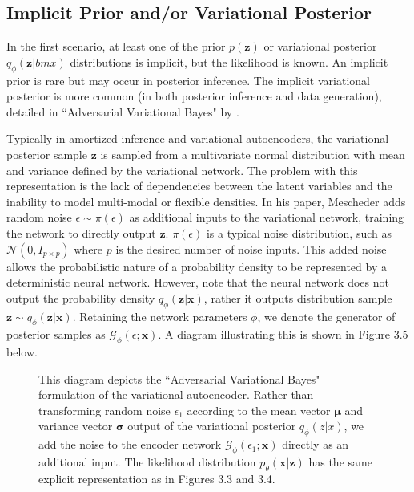 \documentclass[honours,12pt]{unswthesis}
\numberwithin{equation}{section}
\theoremstyle{definition}
\begin{document}
\subsection{Implicit Prior and/or Variational Posterior}
In the first scenario, at least one of the prior $p(\bm{z})$ or variational posterior $q_\phi(\bm{z}|bm{x})$ distributions is implicit, but the likelihood is known. An implicit prior is rare but may occur in posterior inference. The implicit variational posterior is more common (in both posterior inference and data generation), detailed in ``Adversarial Variational Bayes" by \citet{mescheder}.

Typically in amortized inference and variational autoencoders, the variational posterior sample $\bm{z}$ is sampled from a multivariate normal distribution with mean and variance defined by the variational network. The problem with this representation is the lack of dependencies between the latent variables and the inability to model multi-modal or flexible densities. In his paper, Mescheder adds random noise $\epsilon\sim \pi(\epsilon)$ as additional inputs to the variational network, training the network to directly output $\bm{z}$. $\pi(\epsilon)$ is a typical noise distribution, such as $\mathcal{N}(0,I_{p\times p})$ where $p$ is the desired number of noise inputs. This added noise allows the probabilistic nature of a probability density to be represented by a deterministic neural network. However, note that the neural network does not output the probability density $q_\phi(\bm{z}|\bm{x})$, rather it outputs distribution sample $\bm{z}\sim q_\phi(\bm{z}|\bm{x})$. Retaining the network parameters $\phi$, we denote the generator of posterior samples as $\mathcal{G}_\phi(\epsilon;\bm{x})$. A diagram illustrating this is shown in Figure 3.5 below.\\
\begin{figure}[h]
  \centering
   \caption{\small This diagram depicts the ``Adversarial Variational Bayes" formulation of the variational autoencoder. Rather than transforming random noise $\epsilon_1$ according to the mean vector $\bm{\mu}$ and variance vector $\bm{\sigma}$ output of the variational posterior $q_\phi(z|x)$, we add the noise to the encoder network $\mathcal{G}_\phi(\epsilon_1;\bm{x})$ directly as an additional input. The likelihood distribution $p_\theta(\bm{x}|\bm{z})$ has the same explicit representation as in Figures 3.3 and 3.4.}
\end{figure}
\end{document}
